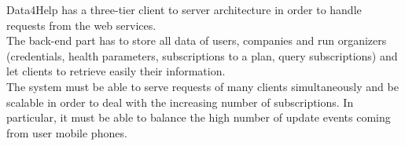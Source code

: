Data4Help has 
a three-tier client to server architecture in order to handle requests from the web services.\\
The back-end part has to store all data of users, companies and run organizers (credentials, health parameters, subscriptions to a plan, query subscriptions) and let clients to retrieve easily their information. \\
The system must be able to serve requests of many clients simultaneously and be scalable in order to deal with the increasing number of subscriptions. In particular, it must be able to balance the high number of update events coming from user mobile phones.
